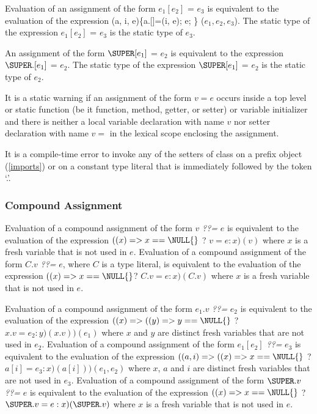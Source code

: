\documentclass{article}
\newcommand{\code}[1]{{\sf #1}}
\begin{document}
\LMHash{}
Evaluation of an assignment of the form $e_1[e_2]$ \code{=} $e_3$ is equivalent to the evaluation of the expression \code{(a, i, e)\{a.[]=(i, e); \RETURN{} e; \} ($e_1, e_2, e_3$)}.  The static type of the expression $e_1[e_2]$ \code{=} $e_3$ is the static type of $e_3$.

\LMHash{}
An assignment of the form $\SUPER[e_1]$ \code{=} $e_2$ is equivalent to the expression $\SUPER.[e_1]$ \code{=} $e_2$.  The static type of the expression $\SUPER[e_1]$ \code{=} $e_2$ is the static type of $e_2$.



\LMHash{}
It is a static warning if an assignment of the form $v = e$ occurs inside a top level or static function (be it function, method, getter, or setter) or variable initializer and there is neither a local variable declaration with name $v$  nor setter declaration with name $v=$ in the lexical scope enclosing the assignment.

\LMHash{}
It is a compile-time error to invoke any of the setters of class  on a prefix object (\ref{imports}) or on a constant type literal that is  immediately followed by the token `.'.



\subsubsection{Compound Assignment}

\LMHash{}
Evaluation of a compound assignment of the form $v$ {\em ??=} $e$ is equivalent to the evaluation of the expression  $((x) => x == \NULL{}$ ?  $v=e : x)(v)$ where $x$ is a fresh variable that is not used in $e$. Evaluation of a compound assignment of the form $C.v$ {\em ??=} $e$, where $C$ is a type literal, is equivalent to the evaluation of the expression  $((x) => x == \NULL{}$?  $C.v=e: x)(C.v)$ where $x$ is a fresh variable that is not used in $e$. 


Evaluation of a compound assignment of the form $e_1.v$ {\em ??=} $e_2$ is equivalent to the evaluation of the expression  $((x) =>((y) => y == \NULL{}$ ? $ x.v = e_2: y)(x.v))(e_1)$ where $x$ and $y$ are distinct fresh variables that are not used in $e_2$. Evaluation of a compound assignment of the form  $e_1[e_2]$  {\em ??=} $e_3$ is equivalent to the evaluation of the expression  
$((a, i) => ((x) => x == \NULL{}$ ?  $a[i] = e_3: x)(a[i]))(e_1, e_2)$ where $x$, $a$ and $i$ are distinct fresh variables that are not used in $e_3$. Evaluation of a compound assignment of the form $\SUPER.v$  {\em ??=} $e$ is equivalent to the evaluation of the expression  $((x) => x == \NULL{}$ ? $\SUPER.v = e: x)(\SUPER.v)$ where $x$ is a fresh variable that is not used in $e$.
\end{document}
